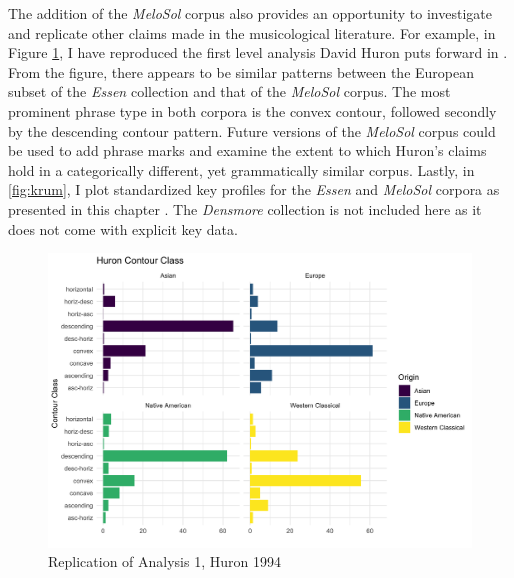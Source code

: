 \documentclass[12pt,]{book}
\begin{document}
The addition of the \emph{MeloSol} corpus also provides an opportunity to investigate and replicate other claims made in the musicological literature.
For example, in Figure \ref{fig:comphuron}, I have reproduced the first level analysis David Huron puts forward in \citep{huronMelodicArchWestern1996}.
From the figure, there appears to be similar patterns between the European subset of the \emph{Essen} collection and that of the \emph{MeloSol} corpus.
The most prominent phrase type in both corpora is the convex contour, followed secondly by the descending contour pattern.
Future versions of the \emph{MeloSol} corpus could be used to add phrase marks and examine the extent to which Huron's claims hold in a categorically different, yet grammatically similar corpus.
Lastly, in \ref{fig:krum}, I plot standardized key profiles for the \emph{Essen} and \emph{MeloSol} corpora as presented in this chapter \citep{krumhanslCognitiveFoundationsMusical2001}.
The \emph{Densmore} collection is not included here as it does not come with explicit key data.

\begin{figure}

{\centering \includegraphics[width=1\linewidth]{img/huronrecreation} 

}

\caption{Replication of Analysis 1, Huron 1994}\label{fig:comphuron}
\end{figure}
\end{document}

